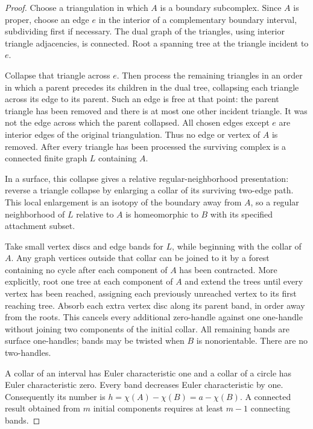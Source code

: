 \begin{proof}
Choose a triangulation in which $A$ is a boundary subcomplex.  Since $A$ is
proper, choose an edge $e$ in the interior of a complementary boundary
interval, subdividing first if necessary.  The dual graph of the triangles,
using interior triangle adjacencies, is connected.  Root a spanning tree
at the triangle incident to $e$.

Collapse that triangle across $e$.  Then process the remaining triangles
in an order in which a parent precedes its children in the dual tree,
collapsing each triangle across its edge to its parent.  Such an edge is
free at that point: the parent triangle has been removed and there is at
most one other incident triangle.  It was not the edge across which the
parent collapsed.  All chosen edges except $e$ are interior edges of the
original triangulation.  Thus no edge or vertex of $A$ is removed.
After every triangle has been processed the surviving complex is a
connected finite graph $L$ containing $A$.

In a surface, this collapse gives a relative regular-neighborhood
presentation: reverse a triangle collapse by enlarging a collar of its
surviving two-edge path.  This local enlargement is an isotopy of the
boundary away from $A$, so a regular neighborhood of $L$ relative to $A$
is homeomorphic to $B$ with its specified attachment subset.

Take small vertex discs and edge bands for $L$, while beginning with the
collar of $A$.  Any graph vertices outside that collar can be joined to
it by a forest containing no cycle after each component of $A$ has been
contracted.  More explicitly, root one tree at each component of $A$ and
extend the trees until every vertex has been reached, assigning each
previously unreached vertex to its first reaching tree.  Absorb each
extra vertex disc along its parent band, in order away from the roots.
This cancels every additional zero-handle against one one-handle without
joining two components of the initial collar.  All remaining bands are
surface one-handles; bands may be twisted when $B$ is nonorientable.
There are no two-handles.

A collar of an interval has Euler characteristic one and a collar of a
circle has Euler characteristic zero.  Every band decreases Euler
characteristic by one.  Consequently its number is
$h=\chi(A)-\chi(B)=a-\chi(B)$.  A connected result obtained from $m$
initial components requires at least $m-1$ connecting bands.
\end{proof}

